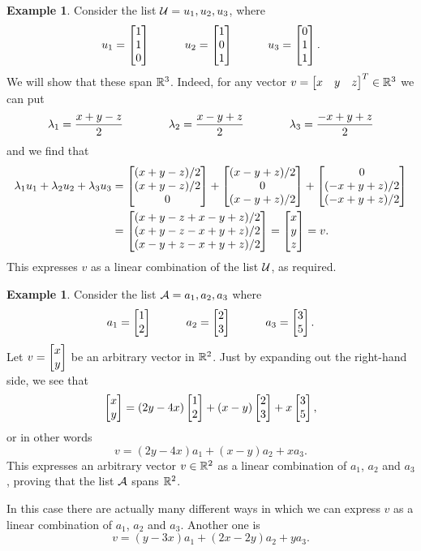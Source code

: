 \documentclass[reqno]{amsart}
\theoremstyle{definition}
\newtheorem{example}[theorem]{Example}
\begin{document}
\begin{example}\label{eg-span-i}
 Consider the list $\mathcal{U}=u_1,u_2,u_3$, where
 \[ u_1 = \left[\begin{matrix} 1 \\ 1 \\ 0 \end{matrix}\right] \hspace{3em}
    u_2 = \left[\begin{matrix} 1 \\ 0 \\ 1 \end{matrix}\right] \hspace{3em}
    u_3 = \left[\begin{matrix} 0 \\ 1 \\ 1 \end{matrix}\right].
 \]
 We will show that these span ${\mathbb{R}}^3$.  Indeed, for any vector
 $v=\left[\begin{matrix} x & y & z\end{matrix}\right]^T\in{\mathbb{R}}^3$ we can put
 \[ \lambda_1 = \frac{ x+y-z}{2} \hspace{4em}
    \lambda_2 = \frac{ x-y+z}{2} \hspace{4em}
    \lambda_3 = \frac{-x+y+z}{2}
 \]
 and we find that
 \begin{align*}
  \lambda_1u_1+\lambda_2u_2+\lambda_3u_3
    &=
   \left[\begin{matrix} (x+y-z)/2 \\ (x+y-z)/2 \\ 0 \end{matrix}\right] +
   \left[\begin{matrix} (x-y+z)/2 \\ 0 \\ (x-y+z)/2 \end{matrix}\right] +
   \left[\begin{matrix} 0 \\ (-x+y+z)/2 \\ (-x+y+z)/2 \end{matrix}\right] \\
    &=
   \left[\begin{matrix} (x+y-z+x-y+z)/2 \\
        (x+y-z-x+y+z)/2 \\
        (x-y+z-x+y+z)/2 \end{matrix}\right]
    = \left[\begin{matrix} x \\ y \\ z \end{matrix}\right] = v.
 \end{align*}
 This expresses $v$ as a linear combination of the list $\mathcal{U}$, as
 required.
\end{example}

\begin{example}\label{eg-span-ii}
 Consider the list $\mathcal{A}=a_1,a_2,a_3$ where
 \[ a_1 = \left[\begin{matrix} 1 \\ 2 \end{matrix}\right] \hspace{3em}
    a_2 = \left[\begin{matrix} 2 \\ 3 \end{matrix}\right] \hspace{3em}
    a_3 = \left[\begin{matrix} 3 \\ 5 \end{matrix}\right].
 \]
 Let $v=\left[\begin{matrix} x \\ y\end{matrix}\right]$ be an arbitrary vector in ${\mathbb{R}}^2$.  Just by
 expanding out the right-hand side, we see that
 \[ \left[\begin{matrix} x \\ y \end{matrix}\right] =
     (2y-4x)\left[\begin{matrix} 1 \\ 2 \end{matrix}\right] + (x-y)\left[\begin{matrix} 2\\ 3\end{matrix}\right] + x\left[\begin{matrix} 3\\5 \end{matrix}\right],
 \]
 or in other words
 \[ v = (2y-4x)a_1 + (x-y)a_2 + x a_3. \]
 This expresses an arbitrary vector $v\in{\mathbb{R}}^2$ as a linear combination
 of $a_1$, $a_2$ and $a_3$, proving that the list $\mathcal{A}$ spans ${\mathbb{R}}^2$.

 In this case there are actually many different ways in which we can
 express $v$ as a linear combination of $a_1$, $a_2$ and $a_3$.
 Another one is
 \[ v = (y-3x)a_1 + (2x-2y)a_2 + y a_3. \]
\end{example}
\end{document}
